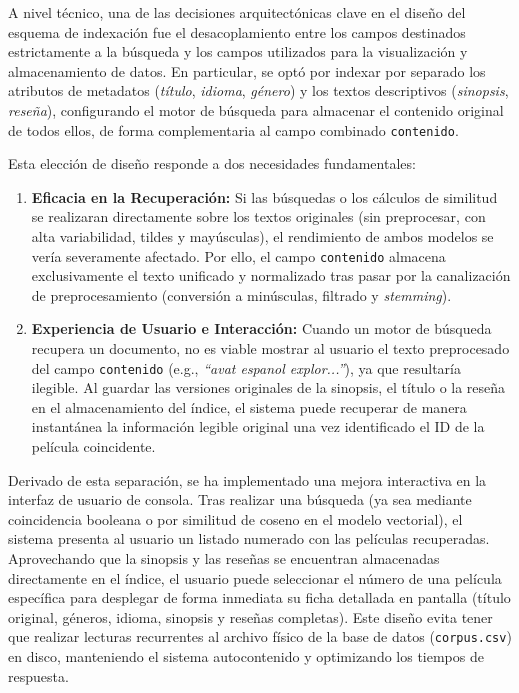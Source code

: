 \documentclass[conference,a4paper]{IEEEtran}
\begin{document}
A nivel técnico, una de las decisiones arquitectónicas clave en el diseño del esquema de indexación fue el desacoplamiento entre los campos destinados estrictamente a la búsqueda y los campos utilizados para la visualización y almacenamiento de datos. En particular, se optó por indexar por separado los atributos de metadatos (\textit{título}, \textit{idioma}, \textit{género}) y los textos descriptivos (\textit{sinopsis}, \textit{reseña}), configurando el motor de búsqueda para almacenar el contenido original de todos ellos, de forma complementaria al campo combinado \texttt{contenido}.

Esta elección de diseño responde a dos necesidades fundamentales:
\begin{enumerate}
    \item \textbf{Eficacia en la Recuperación:} Si las búsquedas o los cálculos de similitud se realizaran directamente sobre los textos originales (sin preprocesar, con alta variabilidad, tildes y mayúsculas), el rendimiento de ambos modelos se vería severamente afectado. Por ello, el campo \texttt{contenido} almacena exclusivamente el texto unificado y normalizado tras pasar por la canalización de preprocesamiento (conversión a minúsculas, filtrado y \textit{stemming}).
    \item \textbf{Experiencia de Usuario e Interacción:} Cuando un motor de búsqueda recupera un documento, no es viable mostrar al usuario el texto preprocesado del campo \texttt{contenido} (e.g., \textit{``avat espanol explor...''}), ya que resultaría ilegible. Al guardar las versiones originales de la sinopsis, el título o la reseña en el almacenamiento del índice, el sistema puede recuperar de manera instantánea la información legible original una vez identificado el ID de la película coincidente.
\end{enumerate}

Derivado de esta separación, se ha implementado una mejora interactiva en la interfaz de usuario de consola. Tras realizar una búsqueda (ya sea mediante coincidencia booleana o por similitud de coseno en el modelo vectorial), el sistema presenta al usuario un listado numerado con las películas recuperadas. Aprovechando que la sinopsis y las reseñas se encuentran almacenadas directamente en el índice, el usuario puede seleccionar el número de una película específica para desplegar de forma inmediata su ficha detallada en pantalla (título original, géneros, idioma, sinopsis y reseñas completas). Este diseño evita tener que realizar lecturas recurrentes al archivo físico de la base de datos (\texttt{corpus.csv}) en disco, manteniendo el sistema autocontenido y optimizando los tiempos de respuesta.
\end{document}
